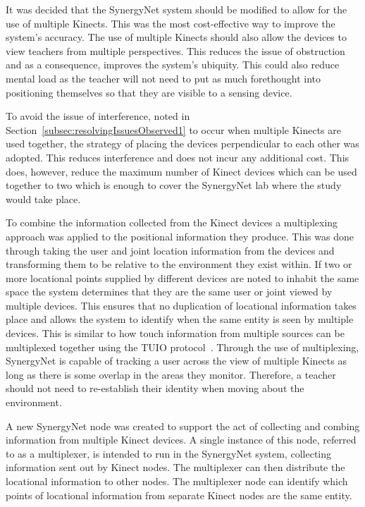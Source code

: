 \documentclass[link]{IWCOMP}
\begin{document}
It was decided that the SynergyNet system should be modified to allow for the use of multiple Kinects.
This was the most cost-effective way to improve the system's accuracy.
The use of multiple Kinects should also allow the devices to view teachers from multiple perspectives.
This reduces the issue of obstruction and as a consequence, improves the system's ubiquity.
This could also reduce mental load as the teacher will not need to put as much forethought into positioning themselves so that they are visible to a sensing device.

To avoid the issue of interference, noted in Section~\ref{subsec:resolvingIssuesObserved1} to occur when multiple Kinects are used together, the strategy of placing the devices perpendicular to each other was adopted.
This reduces interference and does not incur any additional cost.
This does, however, reduce the maximum number of Kinect devices which can be used together to two which is enough to cover the SynergyNet lab where the study would take place.

To combine the information collected from the Kinect devices a multiplexing approach was applied to the positional information they produce.
This was done through taking the user and joint location information from the devices and transforming them to be relative to the environment they exist within.
If two or more locational points supplied by different devices are noted to inhabit the same space the system determines that they are the same user or joint viewed by multiple devices.
This ensures that no duplication of locational information takes place and allows the system to identify when the same entity is seen by multiple devices.
This is similar to how touch information from multiple sources can be multiplexed together using the TUIO protocol~\citep{Kaltenbrunner2009}.
Through the use of multiplexing, SynergyNet is capable of tracking a user across the view of multiple Kinects as long as there is some overlap in the areas they monitor.
Therefore, a teacher should not need to re-establish their identity when moving about the environment.

A new SynergyNet node was created to support the act of collecting and combing information from multiple Kinect devices.
A single instance of this node, referred to as a multiplexer, is intended to run in the SynergyNet system, collecting information sent out by Kinect nodes.
The multiplexer can then distribute the locational information to other nodes.
The multiplexer node can identify which points of locational information from separate Kinect nodes are the same entity.
\end{document}
